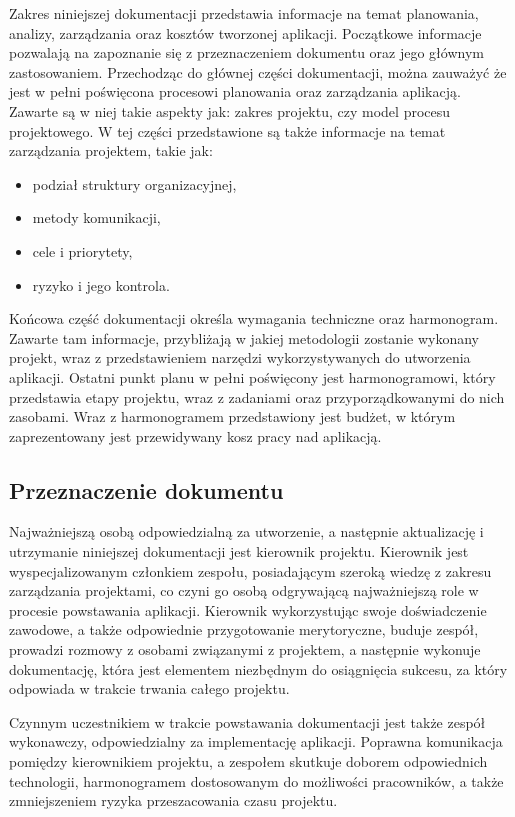 \documentclass[12pt,a4paper]{article}
\begin{document}
Zakres niniejszej dokumentacji przedstawia informacje na temat planowania, analizy, zarządzania oraz kosztów tworzonej aplikacji. Początkowe informacje pozwalają na zapoznanie się z przeznaczeniem dokumentu oraz jego głównym zastosowaniem. Przechodząc do głównej części dokumentacji, można zauważyć że jest w pełni poświęcona procesowi planowania oraz zarządzania aplikacją. Zawarte są w niej takie aspekty jak: zakres projektu, czy model procesu projektowego. W tej części przedstawione są także informacje na temat zarządzania projektem, takie jak: 
\begin{itemize}
    \item podział struktury organizacyjnej,
    \item metody komunikacji, 
    \item cele i priorytety, 
    \item ryzyko i jego kontrola.
\end{itemize}
Końcowa część dokumentacji określa wymagania techniczne oraz harmonogram. Zawarte tam informacje, przybliżają w jakiej metodologii zostanie wykonany projekt, wraz z przedstawieniem narzędzi wykorzystywanych do utworzenia aplikacji. Ostatni punkt planu w pełni poświęcony jest harmonogramowi, który przedstawia etapy projektu, wraz z zadaniami oraz przyporządkowanymi do nich zasobami. Wraz z harmonogramem przedstawiony jest budżet, w którym zaprezentowany jest przewidywany kosz pracy nad aplikacją.

\subsection{Przeznaczenie dokumentu}

Najważniejszą osobą odpowiedzialną za utworzenie, a następnie aktualizację i utrzymanie niniejszej dokumentacji jest kierownik projektu. Kierownik jest wyspecjalizowanym członkiem zespołu, posiadającym szeroką wiedzę z zakresu zarządzania projektami, co czyni go osobą odgrywającą najważniejszą role w procesie powstawania aplikacji. Kierownik wykorzystując swoje doświadczenie zawodowe, a także odpowiednie przygotowanie merytoryczne, buduje zespół, prowadzi rozmowy z osobami związanymi z projektem, a następnie wykonuje dokumentację, która jest elementem niezbędnym do osiągnięcia sukcesu, za który odpowiada w trakcie trwania całego projektu.

Czynnym uczestnikiem w trakcie powstawania dokumentacji jest także zespół wykonawczy, odpowiedzialny za implementację aplikacji. Poprawna komunikacja pomiędzy kierownikiem projektu, a zespołem skutkuje doborem odpowiednich technologii, harmonogramem dostosowanym do możliwości pracowników, a także zmniejszeniem ryzyka przeszacowania czasu projektu.
\end{document}
